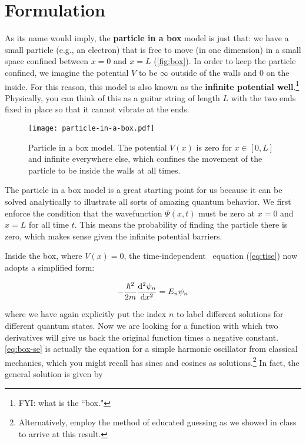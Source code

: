 \section{Formulation}

As its name would imply, the \textbf{particle in a box} model is just that: we have a small particle (e.g., an electron) that is free to move (in one dimension) in a small space confined between $x = 0$ and $x = L$ (\autoref{fig:box}). 
In order to keep the particle confined, we imagine the potential $V$ to be $\infty$ outside of the walls and 0 on the inside. 
For this reason, this model is also known as the \textbf{infinite potential well}.\footnote{FYI: what is the ``box."}
Physically, you can think of this as a guitar string of length $L$ with the two ends fixed in place so that it cannot vibrate at the ends.

\begin{figure}[!h]
	\centering
	\texttt{[image: particle-in-a-box.pdf]}
	\caption{Particle in a box model. 
		The potential $V(x)$ is zero for $x \in [0,L]$ and infinite everywhere else, which confines the movement of the particle to be inside the walls at all times.}
	\label{fig:box}
\end{figure}

The particle in a box model is a great starting point for us because it can be solved analytically to illustrate all sorts of amazing quantum behavior. 
We first enforce the condition that the wavefunction $\Psi(x,t)$ must be zero at $x = 0$ and $x = L$ for all time $t$. 
This means the probability of finding the particle there is zero, which makes sense given the infinite potential barriers.

Inside the box, where $V(x) = 0$, the time-independent \Sch\ equation (\autoref{eq:tise}) now adopts a simplified form:

\begin{tcolorbox}[title=\Sch\ equation for particle in a box] \vspace{-2ex}
	\begin{equation}
		-\frac{\hbar^2}{2m} \dv[2]{\psi_n}{x} = E_n\psi_n  \label{eq:box-se}
	\end{equation}
\end{tcolorbox}

\noindent where we have again explicitly put the index $n$ to label different solutions for different quantum states. 
Now we are looking for a function with which two derivatives will give us back the original function times a negative constant. 
\autoref{eq:box-se} is actually the equation for a simple harmonic oscillator from classical mechanics, which you might recall has sines and cosines as solutions.\footnote{Alternatively, employ the method of educated guessing as we showed in class to arrive at this result.} 
In fact, the general solution is given by 

